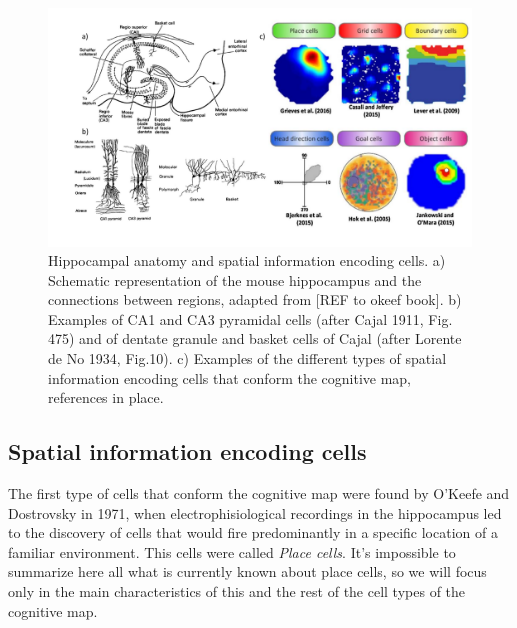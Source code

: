 \begin{figure}
    \centering
    \includegraphics[width=\textwidth]{Figures/Chapter1/intro_fig1.pdf}
    \caption{Hippocampal anatomy and spatial information encoding cells. a) Schematic representation of the mouse hippocampus and the connections between regions, adapted from [REF to okeef book]. b) Examples of CA1 and CA3 pyramidal cells (after Cajal 1911, Fig. 475) and of dentate granule and basket cells of Cajal (after Lorente de No 1934, Fig.10). c) Examples of the different types of spatial information encoding cells that conform the cognitive map, references in place.}
    \label{fig:chap1:spatialnavigation}
\end{figure}

\subsection{Spatial information encoding cells}
\label{chap1:sec:1:subsec2:spat_info_cells}
The first type of cells that conform the cognitive map were found by O’Keefe and Dostrovsky in 1971, when electrophisiological recordings in the hippocampus led to the discovery of cells that would fire predominantly in a specific location of a familiar environment.
This cells were called \textit{Place cells}. 
It's impossible to summarize here all what is currently known about place cells, so we will focus only in the main characteristics of this and the rest of the cell types of the cognitive map.

